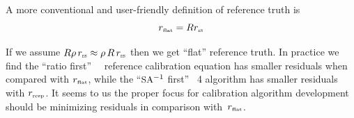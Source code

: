 \documentclass[12pt]{article}
\begin{document}
\vspace{2mm}
A more conventional and user-friendly definition of reference truth
is
\begin{equation}
  r_{\mbox{\tiny flat}} =  R r_{\mbox{\tiny\textsc{es}}}
\end{equation} 

\noindent
If we assume $R\rho\,r_{\mbox{\tiny\textsc{es}}} \approx \rho\,R\,r_{\mbox{\tiny\textsc{es}}}$ then we get
``flat'' reference truth.  In practice we find the ``ratio first''
\umbc\ \ccast\ reference calibration equation has smaller residuals
when compared with $r_{\mbox{\tiny flat}}$, while the ``$\mbox{\small SA}^{-1}$ first'' \noaa~4
algorithm has smaller residuals with $r_{\mbox{\tiny resp}}$.  It seems to us the
proper focus for calibration algorithm development should be
minimizing residuals in comparison with~$r_{\mbox{\tiny flat}}$.
\end{document}
